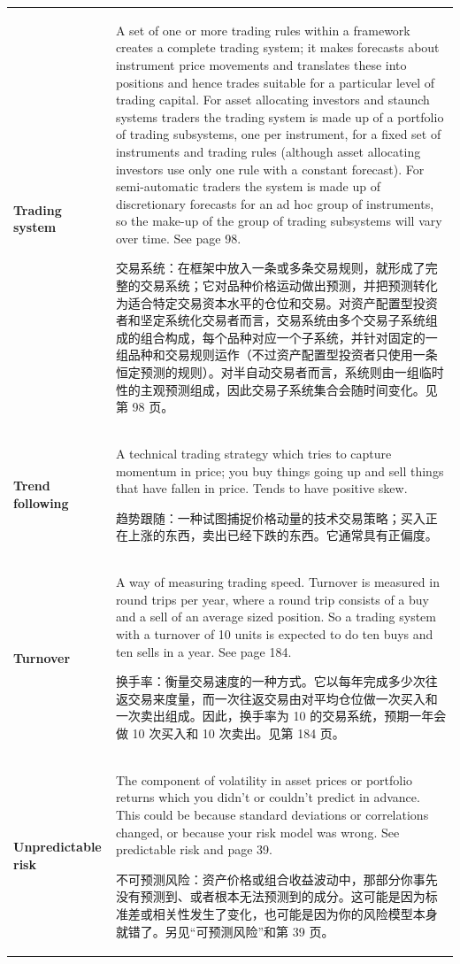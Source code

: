 \begin{chinesetableblock}
{\begin{longtable}{@{}>{\raggedright\arraybackslash\bfseries} p{}>{\raggedright\arraybackslash} p{}@{}}
Trading system & A set of one or more trading rules within a framework creates a complete trading system; it makes forecasts about instrument price movements and translates these into positions and hence trades suitable for a particular level of trading capital. For asset allocating investors and staunch systems traders the trading system is made up of a portfolio of trading subsystems, one per instrument, for a fixed set of instruments and trading rules (although asset allocating investors use only one rule with a constant forecast). For semi-automatic traders the system is made up of discretionary forecasts for an ad hoc group of instruments, so the make-up of the group of trading subsystems will vary over time. See page 98. \par 交易系统：在框架中放入一条或多条交易规则，就形成了完整的交易系统；它对品种价格运动做出预测，并把预测转化为适合特定交易资本水平的仓位和交易。对资产配置型投资者和坚定系统化交易者而言，交易系统由多个交易子系统组成的组合构成，每个品种对应一个子系统，并针对固定的一组品种和交易规则运作（不过资产配置型投资者只使用一条恒定预测的规则）。对半自动交易者而言，系统则由一组临时性的主观预测组成，因此交易子系统集合会随时间变化。见第 98 页。 \\[0.65em]
Trend following & A technical trading strategy which tries to capture momentum in price; you buy things going up and sell things that have fallen in price. Tends to have positive skew. \par 趋势跟随：一种试图捕捉价格动量的技术交易策略；买入正在上涨的东西，卖出已经下跌的东西。它通常具有正偏度。 \\[0.65em]
Turnover & A way of measuring trading speed. Turnover is measured in round trips per year, where a round trip consists of a buy and a sell of an average sized position. So a trading system with a turnover of 10 units is expected to do ten buys and ten sells in a year. See page 184. \par 换手率：衡量交易速度的一种方式。它以每年完成多少次往返交易来度量，而一次往返交易由对平均仓位做一次买入和一次卖出组成。因此，换手率为 10 的交易系统，预期一年会做 10 次买入和 10 次卖出。见第 184 页。 \\[0.65em]
Unpredictable risk & The component of volatility in asset prices or portfolio returns which you didn’t or couldn’t predict in advance. This could be because standard deviations or correlations changed, or because your risk model was wrong. See predictable risk and page 39. \par 不可预测风险：资产价格或组合收益波动中，那部分你事先没有预测到、或者根本无法预测到的成分。这可能是因为标准差或相关性发生了变化，也可能是因为你的风险模型本身就错了。另见“可预测风险”和第 39 页。 \\[0.65em]

\end{longtable}}
\end{chinesetableblock}
